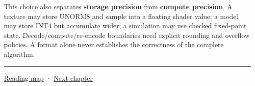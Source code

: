 This choice also separates \textbf{storage precision} from \textbf{compute precision}. A texture may store UNORM8 and sample into a floating shader value; a model may store INT4 but accumulate wider; a simulation may use checked fixed-point state. Decode/compute/re-encode boundaries need explicit rounding and overflow policies. A format alone never establishes the correctness of the complete algorithm.

\begin{center}\rule{0.5\linewidth}{0.5pt}\end{center}

\hyperref[volume-reading-map]{Reading map} · \hyperref[05-engine-i-ch002-how-bytes-become-programs-objects-and-resource-references]{Next chapter}
